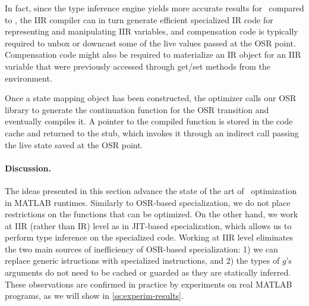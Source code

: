 \noindent In fact, since the type inference engine yields more accurate results for \gOptIIR\ compared to \gIIR, the IIR compiler can in turn generate efficient specialized IR code for representing and manipulating IIR variables, and compensation code is typically required to unbox or downcast some of the live values passed at the OSR point.
\ifdefined \fullver
Compensation code might also be required to materialize an IR object for an IIR variable that were previously accessed through get/set methods from the environment. %
\fi

Once a state mapping object has been constructed, the optimizer calls our OSR library to generate the continuation function for the OSR transition and eventually compiles it. A pointer to the compiled function is stored in the code cache and returned to the stub, which invokes it through an indirect call passing the live state saved at the OSR point.

\paragraph{Discussion.}
The ideas presented in this section advance the state of the art of \feval\ optimization in MATLAB runtimes.
Similarly to OSR-based specialization, we do not place restrictions on the functions that can be optimized. On the other hand, we work at IIR (rather than IR) level as in JIT-based specialization, which allows us to perform type inference on the specialized code. Working at IIR level eliminates the two main sources of inefficiency of OSR-based specialization: 1) we can replace generic istructions with specialized instructions, and 2) the types of $g$'s arguments do not need to be cached or guarded as they are statically inferred. These observations are confirmed in practice by experiments on real MATLAB programs, as we will show in \mysection\ref{ss:experim-results}.
